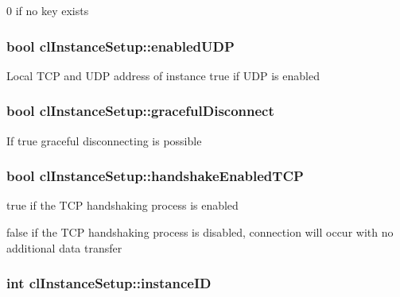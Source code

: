  0 if no key exists \hypertarget{classcl_instance_setup_ae27488feccbe024221bcb6f8c19f8eae}{
\subsubsection[{enabledUDP}]{\setlength{\rightskip}{0pt plus 5cm}bool {\bf clInstanceSetup::enabledUDP}}}
\label{classcl_instance_setup_ae27488feccbe024221bcb6f8c19f8eae}
Local TCP and UDP address of instance true if UDP is enabled \hypertarget{classcl_instance_setup_a9aace39dd40220ba6718fdae22e32970}{
\subsubsection[{gracefulDisconnect}]{\setlength{\rightskip}{0pt plus 5cm}bool {\bf clInstanceSetup::gracefulDisconnect}}}
\label{classcl_instance_setup_a9aace39dd40220ba6718fdae22e32970}
If true graceful disconnecting is possible \hypertarget{classcl_instance_setup_a9ed34974bb534f753f000490f8089d6a}{
\subsubsection[{handshakeEnabledTCP}]{\setlength{\rightskip}{0pt plus 5cm}bool {\bf clInstanceSetup::handshakeEnabledTCP}}}
\label{classcl_instance_setup_a9ed34974bb534f753f000490f8089d6a}
true if the TCP handshaking process is enabled \par
 false if the TCP handshaking process is disabled, connection will occur with no additional data transfer \hypertarget{classcl_instance_setup_aca3c51adce99fa0900b023a4ab313a57}{
\subsubsection[{instanceID}]{\setlength{\rightskip}{0pt plus 5cm}int {\bf clInstanceSetup::instanceID}}}
